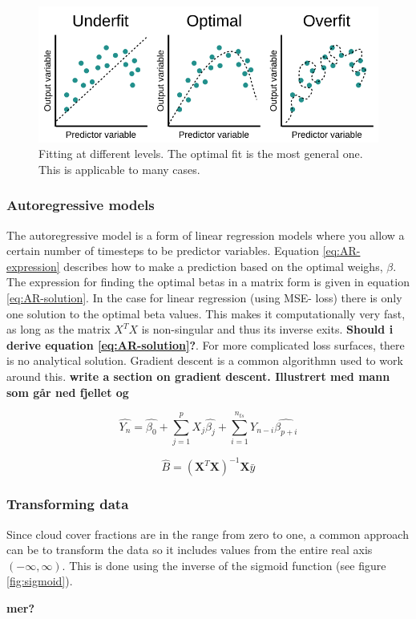 \begin{figure}[hp]
    \centering
    \includegraphics{Chapter2_Theory/images/linear_regression.png}
    \caption{Fitting at different levels. The optimal fit is the most general one. This is applicable to many cases.}
    \label{fig:linreg_overfitting}
\end{figure}

\subsubsection{Autoregressive models} \label{sec:ARmodels}
The autoregressive model is a form of linear regression models where you allow a certain number of timesteps to be predictor variables. Equation \eqref{eq:AR-expression} describes how to make a prediction based on the optimal weighs, $\beta$. The expression for finding the optimal betas in a matrix form is given in equation \eqref{eq:AR-solution}. In the case for linear regression (using MSE- loss) there is only one solution to the optimal beta values. This makes it computationally very fast, as long as the matrix $X^TX$ is non-singular and thus its inverse exits. \textbf{Should i derive equation \eqref{eq:AR-solution}?}. For more complicated loss surfaces, there is no analytical solution. Gradient descent is a common algorithmn used to work around this. \textbf{write a section on gradient descent. Illustrert med mann som går ned fjellet og } 

\begin{equation} \label{eq:AR-expression}
    \hat{Y_n} = \hat{\beta_0} + \sum_{j=1}^p X_j\hat{\beta_j} + \sum_{i = 1}^{n_{ts}} Y_{n-i}\hat{\beta_{p+i}}
\end{equation}

\begin{equation} \label{eq:AR-solution}
    \hat{B} = \left( \textbf{X}^T\textbf{X} \right)^{-1}\textbf{X}\bar{y}
\end{equation}

\subsubsection{Transforming data} \label{sec:transforming_cloud_cover}
Since cloud cover fractions are in the range from zero to one, a common approach can be to transform the data so it includes values from the entire real axis $(-\infty, \infty)$. This is done using the inverse of the sigmoid function (see figure \ref{fig:sigmoid}).

\textbf{mer?}

